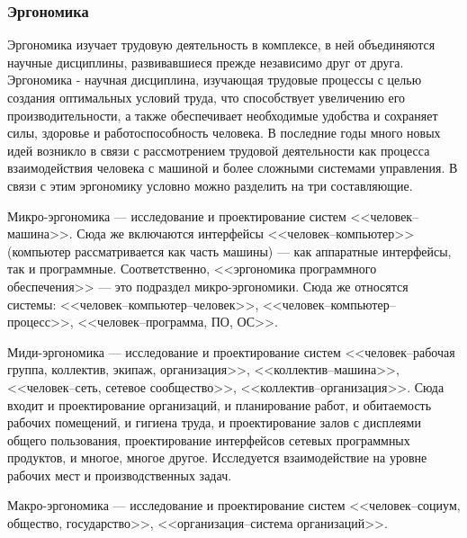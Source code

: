 \subsubsection{Эргономика}
\label{sec:bgd:trud:ergo}
Эргономика изучает трудовую деятельность в комплексе, в ней объединяются научные дисциплины, развивавшиеся прежде независимо друг от друга.
Эргономика - научная дисциплина, изучающая трудовые процессы с целью создания оптимальных условий труда, что способствует увеличению его производительности, а также обеспечивает необходимые удобства и сохраняет силы, здоровье и работоспособность человека. В последние годы много новых идей возникло в связи с рассмотрением трудовой деятельности как процесса взаимодействия человека с машиной и более сложными системами управления. В связи с этим эргономику условно можно разделить на три составляющие.

\begin{compactitem}
\item Микро-эргономика --- исследование и проектирование систем <<человек--машина>>. Сюда же включаются интерфейсы <<человек--компьютер>> (компьютер рассматривается как часть машины) --- как аппаратные интерфейсы, так и программные. Соответственно, <<эргономика программного обеспечения>> --- это подраздел микро-эргономики. Сюда же относятся системы: <<человек--компьютер--человек>>, <<человек--компьютер--процесс>>, <<человек--программа, ПО, ОС>>.
\item Миди-эргономика --- исследование и проектирование систем <<человек--рабочая группа, коллектив, экипаж, организация>>, <<коллектив--машина>>, <<человек--сеть, сетевое сообщество>>, <<коллектив--организация>>. Сюда входит и проектирование организаций, и планирование работ, и обитаемость рабочих помещений, и гигиена труда, и проектирование залов с дисплеями общего пользования, проектирование интерфейсов сетевых программных продуктов, и многое, многое другое. Исследуется взаимодействие на уровне рабочих мест и производственных задач.
\item Макро-эргономика --- исследование и проектирование систем <<человек--социум, общество, государство>>, <<организация--система организаций>>.
\end{compactitem}

